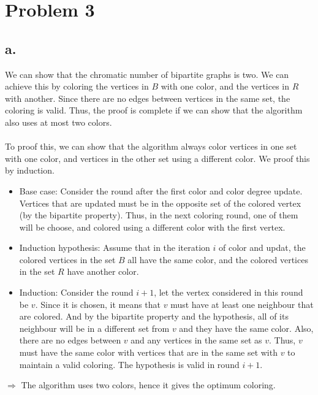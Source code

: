 \documentclass{article}
\begin{document}
\pagebreak
\section*{Problem 3}
\subsection*{a.}
We can show that the chromatic number of bipartite graphs is two. We can achieve this by coloring the vertices in $B$ with one color, and the vertices in $R$ with another. Since there are no edges between vertices in the same set, the coloring is valid. Thus, the proof is complete if we can show that the algorithm also uses at most two colors. \\\\
To proof this, we can show that the algorithm always color vertices in one set with one color, and vertices in the other set using a different color. We proof this by induction. 
\begin{itemize}
\item Base case: Consider the round after the first color and color degree update. Vertices that are updated must be in the opposite set of the colored vertex (by the bipartite property). Thus, in the next coloring round, one of them will be choose, and colored using a different color with the first vertex.
\item Induction hypothesis: Assume that in the iteration $i$ of color and updat, the colored vertices in the set $B$ all have the same color, and the colored vertices in the set $R$ have another color.
\item Induction: Consider the round $i+1$, let the vertex considered in this round be $v$. Since it is chosen, it means that $v$ must have at least one neighbour that are colored. And by the bipartite property and the hypothesis, all of its neighbour will be in a different set from $v$ and they have the same color. Also, there are no edges between $v$ and any vertices in the same set as $v$. Thus, $v$ must have the same color with vertices that are in the same set with $v$ to maintain a valid coloring. The hypothesis is valid in round $i+1$. 
\end{itemize}
$\Rightarrow$ The algorithm uses two colors, hence it gives the optimum coloring.

\pagebreak
\end{document}
